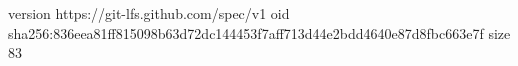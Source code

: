 version https://git-lfs.github.com/spec/v1
oid sha256:836eea81ff815098b63d72dc144453f7aff713d44e2bdd4640e87d8fbc663e7f
size 83
